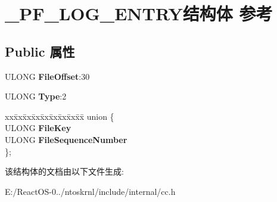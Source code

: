 \hypertarget{struct___p_f___l_o_g___e_n_t_r_y}{}\section{\+\_\+\+P\+F\+\_\+\+L\+O\+G\+\_\+\+E\+N\+T\+R\+Y结构体 参考}
\label{struct___p_f___l_o_g___e_n_t_r_y}
\subsection*{Public 属性}
\begin{DoxyCompactItemize}
\item 
\mbox{\label{struct___p_f___l_o_g___e_n_t_r_y_a4e328004672fcd3d7f48fe7698778bbe}} 
U\+L\+O\+NG {\bfseries File\+Offset}\+:30
\item 
\mbox{\label{struct___p_f___l_o_g___e_n_t_r_y_a33dfdfaa45610bc89fc83c2d88c84126}} 
U\+L\+O\+NG {\bfseries Type}\+:2
\item 
\mbox{\label{struct___p_f___l_o_g___e_n_t_r_y_a0881da39c11e02e146c14d82eeda5e7e}} 
\begin{tabbing}
xx\=xx\=xx\=xx\=xx\=xx\=xx\=xx\=xx\=\kill
union \{\\
\>ULONG {\bfseries FileKey}\\
\>ULONG {\bfseries FileSequenceNumber}\\
\}; \\

\end{tabbing}\end{DoxyCompactItemize}


该结构体的文档由以下文件生成\+:\begin{DoxyCompactItemize}
\item 
E\+:/\+React\+O\+S-\/0../ntoskrnl/include/internal/cc.\+h\end{DoxyCompactItemize}
